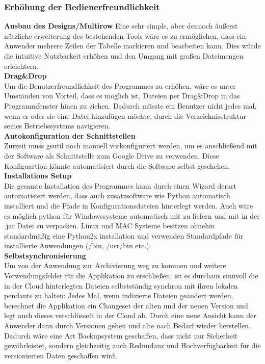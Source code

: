 \documentclass[12pt,a4paper,bibliography=totocnumbered,listof=totocnumbered]{scrartcl}
\begin{document}
\subsubsection{Erhöhung der Bedienerfreundlichkeit}
\textbf{Ausbau des Designs/Multirow}
Eine sehr simple, aber dennoch äußerst nützliche erweiterung des bestehenden Tools wäre es zu ermöglichen, dass ein Anwender mehrere Zeilen der Tabelle markieren und bearbeiten kann. Dies würde die intuitive Nutzbarkeit erhöhen und den Umgang mit großen Dateimengen erleichtern. 
\\\textbf{Drag\&Drop}\\
Um die Benutzerfreundlichkeit des Programmes zu erhöhen, wäre es unter Umständen von Vorteil, dass es möglich ist, Dateien per Drag\&Drop in das Programmfenster hinen zu ziehen. Dadurch müsste ein Benutzer nicht jedes mal, wenn er oder sie eine Datei hinzufügen möchte, durch die Verzeichnisstruktur seines Betriebssystems navigieren.
\\\textbf{Autokonfiguration der Schnittstellen}\\
Zurzeit muss gsutil noch manuell vorkonfiguriert werden, um es anschließend mit der Software als Schnittstelle zum Google Drive zu verwenden. Diese Konfiguartion könnte automatisiert durch die Software selbst geschehen.
\\\textbf{Installations Setup}\\
Die gesamte Installation des Programmes kann durch einen Wizard derart automatisiert werden, dass auch zusatzsoftware wie Python automatisch installiert und die Pfade in Konfigurationsdateien hinterlegt werden. Auch wäre es möglich python für Windowssysteme automatisch mit zu liefern und mit in der .jar Datei zu verpacken. Linux und MAC Systeme besitzen ohnehin standardmäßig eine Python2x installation und verwenden Standardpfade für installierte Anwendungen (/bin, /usr/bin etc.).
\\\textbf{Selbstsynchronisierung}\\
Um von der Anwendung zur Archivierung weg zu kommen und weitere Verwendungsfelder für die Applikation zu erschließen, ist es durchaus sinnvoll die in der Cloud hinterlegten Dateien selbstständig synchron mit ihren lokalen pendants zu halten: Jedes Mal, wenn indizierte Dateien geändert werden, berechnet die Applikation ein Changeset der alten und der neuen Version und legt auch dieses verschlüsselt in der Cloud ab. Durch eine neue Ansicht kann der Anwender dann durch Versionen gehen und alte nach Bedarf wieder herstellen. Dadurch wäre eine Art Backupsystem geschaffen, dass nicht nur Sicherheit gewährleistet, sondern gleichzeitig auch Redundanz und Hochverfügbarkeit für die versionierten Daten geschaffen wird.
\end{document}
